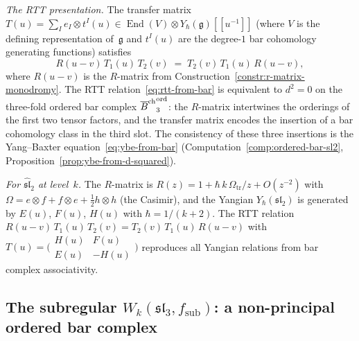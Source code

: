 \begin{construction}
\emph{The RTT presentation.}
The transfer matrix
$T(u)=\sum_I e_I\otimes t^I(u)
\in\operatorname{End}(V)\otimes Y_\hbar(\mathfrak g)[\![u^{-1}]\!]$
(where $V$ is the defining representation of~$\mathfrak g$
and $t^I(u)$ are the degree-$1$ bar cohomology generating
functions) satisfies
\begin{equation}%
R(u{-}v)\,T_1(u)\,T_2(v)
\;=\;
T_2(v)\,T_1(u)\,R(u{-}v),
\end{equation}
where $R(u-v)$ is the $R$-matrix from
Construction~\ref{constr:r-matrix-monodromy}. The RTT
relation~\eqref{eq:rtt-from-bar} is equivalent to $d^2=0$
on the three-fold ordered bar complex
${\overline{B}^{\mathrm{ch}}}_3^{\mathrm{ord}}$: the $R$-matrix intertwines the
orderings of the first two tensor factors, and the transfer
matrix encodes the insertion of a bar cohomology class in
the third slot. The consistency of these three insertions
is the Yang--Baxter
equation~\eqref{eq:ybe-from-bar}
(Computation~\ref{comp:ordered-bar-sl2},
Proposition~\ref{prop:ybe-from-d-squared}).

\emph{For $\widehat{\mathfrak{sl}}_2$ at level~$k$.}
The $R$-matrix is $R(z)=1+\hbar\,k\,\Omega_{\mathrm{tr}}/z+O(z^{-2})$ with
$\Omega=e\otimes f+f\otimes e+\tfrac12 h\otimes h$
(the Casimir), and the Yangian $Y_\hbar(\mathfrak{sl}_2)$
is generated by $E(u)$, $F(u)$, $H(u)$ with
$\hbar=1/(k+2)$. The RTT relation
$R(u{-}v)\,T_1(u)\,T_2(v)=T_2(v)\,T_1(u)\,R(u{-}v)$
with $T(u)=\bigl(\begin{smallmatrix}
H(u) & F(u) \\ E(u) & -H(u)
\end{smallmatrix}\bigr)$
reproduces all Yangian relations from bar complex
associativity.
\end{construction}

\subsection{The subregular $W_k(\mathfrak{sl}_3,f_{\mathrm{sub}})$:
a non-principal ordered bar complex}

